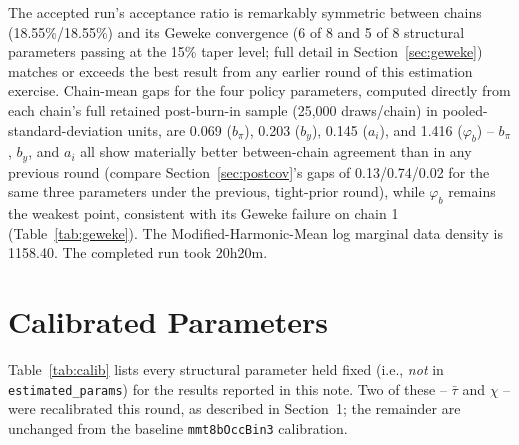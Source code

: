 \documentclass[11pt]{article}
\begin{document}
The accepted run's acceptance ratio is remarkably symmetric between
chains (18.55\%/18.55\%) and its Geweke convergence (6 of 8 and 5 of 8
structural parameters passing at the 15\% taper level; full detail in
Section~\ref{sec:geweke}) matches or exceeds the best result from any
earlier round of this estimation exercise. Chain-mean gaps for the four
policy parameters, computed directly from each chain's full retained
post-burn-in sample (25{,}000 draws/chain) in pooled-standard-deviation
units, are 0.069 ($b_\pi$), 0.203 ($b_y$), 0.145 ($a_i$), and 1.416
($\varphi_b$) -- $b_\pi$, $b_y$, and $a_i$ all show materially better
between-chain agreement than in any previous round (compare
Section~\ref{sec:postcov}'s gaps of 0.13/0.74/0.02 for the same three
parameters under the previous, tight-prior round), while $\varphi_b$
remains the weakest point, consistent with its Geweke failure on chain 1
(Table~\ref{tab:geweke}). The Modified-Harmonic-Mean log marginal data
density is 1158.40. The completed run took 20h20m.

\section{Calibrated Parameters}
\label{sec:calib}

Table~\ref{tab:calib} lists every structural parameter held fixed
(i.e., \emph{not} in \texttt{estimated\_params}) for the results
reported in this note. Two of these -- $\bar\tau$ and $\chi$ -- were
recalibrated this round, as described in Section~1; the remainder are
unchanged from the baseline \texttt{mmt8bOccBin3} calibration.
\end{document}
